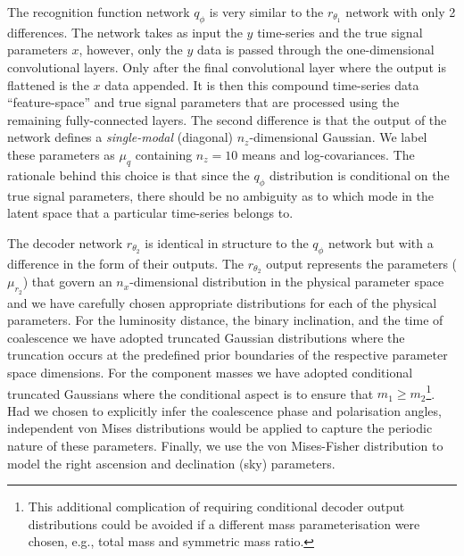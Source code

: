 \documentclass[%
showpacs,
nofootinbib,
 amsmath,amssymb,
 aps,
 twocolumn,
 prl,
 reprint,
floatfix,
]{revtex4-1}
\begin{document}
%
% 
The recognition function network $q_{\phi}$ is very similar to the
$r_{\theta_1}$ network with only 2 differences. The network takes as input the
$y$ time-series and the true signal parameters $x$, however, only the $y$ data
is passed through the one-dimensional convolutional layers. Only after the
final convolutional layer where the output is flattened is the $x$ data
appended. It is then this compound time-series data ``feature-space'' and true
signal parameters that are processed using the remaining fully-connected
layers. The second difference is that the output of the network defines a
\emph{single-modal} (diagonal) $n_z$-dimensional Gaussian. We label these
parameters as $\mu_{q}$ containing $n_z=10$ means and log-covariances. The
rationale behind this choice is that since the $q_{\phi}$ distribution is
conditional on the true signal parameters, there should be no ambiguity as to
which mode in the latent space that a particular time-series belongs to.      

%
%
The decoder network $r_{\theta_2}$ is identical in structure to the
$q_{\phi}$ network but with a difference in the form of their outputs. The
$r_{\theta_2}$ output represents the parameters ($\mu_{r_2}$) that govern an
$n_x$-dimensional distribution in the physical parameter space and we have
carefully chosen appropriate distributions for each of the physical parameters.
For the luminosity distance, the binary inclination, and the time of
coalescence we have adopted truncated Gaussian distributions where the
truncation occurs at the predefined prior boundaries of the respective
parameter space dimensions. For the component masses we have adopted
conditional truncated Gaussians where the conditional aspect is to ensure that
$m_{1}\geq m_{2}$\footnote{This additional complication of requiring conditional
decoder output distributions could be avoided if a different mass
parameterisation were chosen, e.g., total mass and symmetric mass ratio.}. Had
we chosen to explicitly infer the coalescence phase and polarisation angles,
independent von Mises distributions would be applied to capture the periodic
nature of these parameters. Finally, we use the von Mises-Fisher distribution
to model the right ascension and declination (sky) parameters.     
\end{document}
